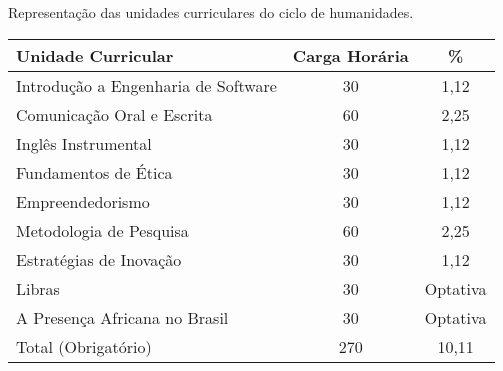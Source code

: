 \begin{quadro}[ht!]
\caption{Representação das unidades curriculares do ciclo de humanidades.}
\label{quad:humanities}
\centering
\begin{tabular}{|l|c|c|}
\hline
\rowcolor{blue1}
 Unidade Curricular &    Carga Horária  & \%\\
\hline
Introdução a Engenharia de Software & 30 & 1,12 \\
Comunicação Oral e Escrita & 60 & 2,25 \\
Inglês Instrumental & 30 & 1,12 \\
Fundamentos de Ética & 30 & 1,12 \\
Empreendedorismo & 30 & 1,12 \\
Metodologia de Pesquisa & 60 & 2,25 \\
Estratégias de Inovação & 30 & 1,12 \\
\hline
Libras & 30 & Optativa \\
A Presença Africana no Brasil & 30 & Optativa \\
\hline
Total (Obrigatório) & 270 & 10,11\\
\hline
\end{tabular}
\end{quadro}